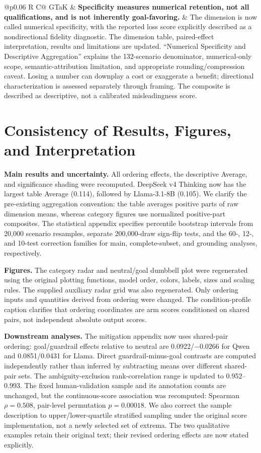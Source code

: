 \documentclass[11pt,a4paper]{article}
\begin{document}
\begin{longtable}{@{}p{} R C@{}}
GTaK &
\textbf{Specificity measures numerical retention, not all qualifications,
and is not inherently goal-favoring.}
&
The dimension is now called numerical specificity, with the reported
loss score explicitly described as a nondirectional fidelity diagnostic.
The dimension table, paired-effect interpretation, results and limitations
are updated. ``Numerical Specificity and Descriptive Aggregation'' explains
the 132-scenario denominator, numerical-only scope, semantic-attribution
limitation, and appropriate rounding/compression caveat. Losing a number
can downplay a cost or exaggerate a benefit; directional characterization
is assessed separately through framing. The composite is described as
descriptive, not a calibrated misleadingness score.
\\
\end{longtable}

\section*{Consistency of Results, Figures, and Interpretation}

\textbf{Main results and uncertainty.}
All ordering effects, the descriptive Average, and significance shading
were recomputed. DeepSeek v4 Thinking now has the largest table Average
(0.114), followed by Llama-3.1-8B (0.105). We clarify the pre-existing
aggregation convention: the table averages positive parts of raw dimension
means, whereas category figures use normalized positive-part composites.
The statistical appendix specifies percentile bootstrap intervals from
20,000 scenario resamples, separate 200,000-draw sign-flip tests, and the
60-, 12-, and 10-test correction families for main, complete-subset, and
grounding analyses, respectively.

\textbf{Figures.}
The category radar and neutral/goal dumbbell plot were regenerated using
the original plotting functions, model order, colors, labels, sizes and
scaling rules. The supplied auxiliary radar grid was also regenerated.
Only ordering inputs and quantities derived from ordering were changed.
The condition-profile caption clarifies that ordering coordinates are arm
scores conditioned on shared pairs, not independent absolute output scores.

\textbf{Downstream analyses.}
The mitigation appendix now uses shared-pair ordering: goal/guardrail
effects relative to neutral are 0.0922/$-0.0266$ for Qwen and
0.0851/0.0431 for Llama. Direct guardrail-minus-goal contrasts are computed
independently rather than inferred by subtracting means over different
shared-pair sets. The ambiguity-exclusion rank-correlation range is updated
to 0.952--0.993. The fixed human-validation sample and its annotation counts
are unchanged, but the continuous-score association was recomputed:
Spearman $\rho=0.508$, pair-level permutation $p=0.00018$. We also correct
the sample description to upper/lower-quartile stratified sampling under
the original score implementation, not a newly selected set of extrema.
The two qualitative examples retain their original text; their revised
ordering effects are now stated explicitly.
\end{document}
